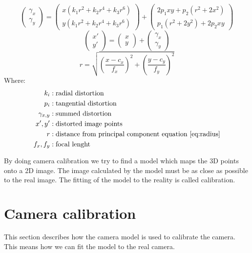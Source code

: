 \documentclass[11pt,a4paper,titlepage,oneside]{report}
\begin{document}
\begin{equation}\label{eq:dist}
	\begin{pmatrix}\gamma_{x} \\
	  \gamma_{y}
	\end{pmatrix}=\begin{pmatrix}
	  x(k_1r^2+k_2r^4+k_3r^6)\\
	  y(k_1r^2+k_2r^4+k_3r^6)
	\end{pmatrix}+\begin{pmatrix}
	  2p_1xy+p_2(r^2+2x^2)\\
	  p_1(r^2+2y^2)+2p_2xy
	\end{pmatrix}
\end{equation}
\begin{equation}\label{eq:pdist}
\begin{pmatrix}x'\\y'\end{pmatrix}=\begin{pmatrix}
x\\y\end{pmatrix}+\begin{pmatrix}\gamma_{x}\\\gamma_{y}\end{pmatrix}
\end{equation}
\begin{equation}\label{eq:radius}
	r = \sqrt{\left(\frac{x-c_x}{f_x}\right)^2+\left(\frac{y-c_y}{f_y}\right)^2}
\end{equation}
Where:
\begin{align*}
  k_{i}					&: \text{radial distortion}\\
  p_{i}					&: \text{tangential distortion}\\
	\gamma_{x,y}	&: \text{summed distortion}\\
  x',y'					&: \text{distorted image points}\\
	r							&: \text{distance from principal component equation \ref{eq:radius}} \\
	f_x,f_y				&: \text{focal lenght}
\end{align*}

By doing camera calibration we try to find a model which maps the 3D points onto a 2D image. The image calculated by the model must be as close as possible to the real image. The fitting of the model to the reality is called calibration.

\section{Camera calibration}\label{sec:cam_calib}
This section describes how the camera model is used to calibrate the camera. This means how we can fit the model to the real camera.
\end{document}
